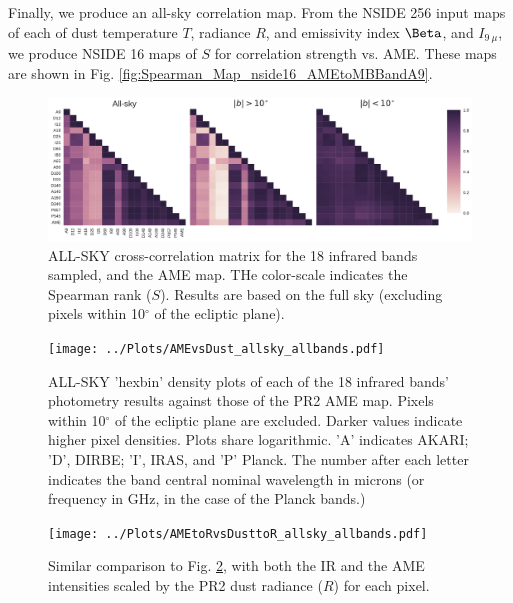 \documentclass[preprint2,longabstract]{aastex}
\begin{document}
  Finally, we produce an all-sky correlation map. From the NSIDE 256 input maps of each of dust temperature $T$, radiance $R$, and emissivity index $\Beta$, and $I_{9~\mu{}}$, we produce NSIDE 16 maps of $S$ for correlation strength vs. AME. These maps are shown in Fig. \ref{fig:Spearman_Map_nside16_AMEtoMBBandA9}.


      \begin{figure}
        \label{fig:AME_IR_crosscorr_allbandsg}
        \includegraphics[width=185mm]{../Plots/all_bands_corr_matrix_wAME_spearman.pdf}
        \centering
        \caption{ALL-SKY cross-correlation matrix for the 18 infrared bands sampled, and the AME map. THe color-scale indicates the Spearman rank ($S$). Results are based on the full sky (excluding pixels within 10$^{\circ}$ of the ecliptic plane).}
      \end{figure}



      \begin{figure}
        \label{fig:AMEvsDust_allsky_allbands}
        \texttt{[image: ../Plots/AMEvsDust\_allsky\_allbands.pdf]}
        \centering
        \caption{ALL-SKY 'hexbin' density plots of each of the 18 infrared bands' photometry results against those of the PR2 AME map. Pixels within 10$^{\circ}$ of the ecliptic plane are excluded. Darker values indicate higher pixel densities. Plots share logarithmic. 'A' indicates AKARI; 'D', DIRBE; 'I', IRAS, and 'P' Planck. The number after each letter indicates the band central nominal wavelength in microns (or frequency in GHz, in the case of the Planck bands.) }
      \end{figure}

      \begin{figure}
        \label{fig:AMEtoRvsDusttoR_allsky_allbands}
        \texttt{[image: ../Plots/AMEtoRvsDusttoR\_allsky\_allbands.pdf]}
        \centering
        \caption{Similar comparison to Fig. \ref{fig:AMEvsDust_allsky_allbands}, with both the IR and the AME intensities scaled by the PR2 dust radiance ($R$) for each pixel. }
      \end{figure}
\end{document}
